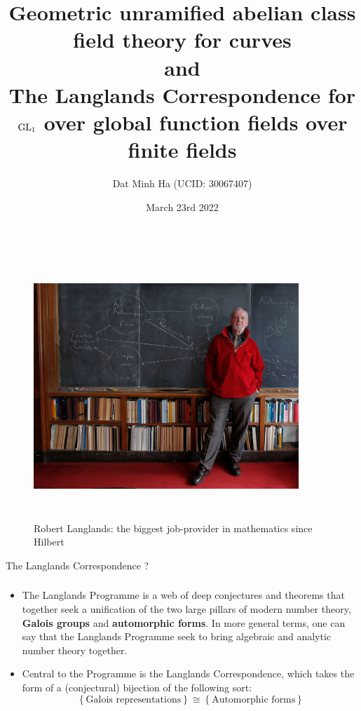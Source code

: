 \documentclass[professionalfonts]{beamer}
\title{Geometric unramified abelian class field theory for curves\\and\\The Langlands Correspondence for $\operatorname{GL}_1$ over global function fields over finite fields}
\author{Dat Minh Ha (UCID: 30067407)}
\institute{Department of Mathematics and Statistics\\University of Calgary}
\date{March 23rd 2022}
\begin{document}
    \frame{\titlepage}
    
    \begin{frame}
        \begin{figure}[H]
            \centering
            \includegraphics[width=10cm,height=10cm,keepaspectratio]{Proposal, timeline, and presentation/robert_langlands.jpg}
            \caption{Robert Langlands: the biggest job-provider in mathematics since Hilbert}
            \label{fig: robert_langlands}
        \end{figure}
    \end{frame}
    
    \begin{frame}{The Langlands Correspondence ?}
        \frametitle{}
        \begin{itemize}
            \item The Langlands Programme is a web of deep conjectures and theorems that together seek a unification of the two large pillars of modern number theory, \textbf{Galois groups} and \textbf{automorphic forms}. In more general terms, one can say that the Langlands Programme seek to bring algebraic and analytic number theory together.
            \item Central to the Programme is the Langlands Correspondence, which takes the form of a (conjectural) bijection of the following sort:    
                $$\left\{\text{Galois representations}\right\} \cong \left\{\text{Automorphic forms}\right\}$$
        \end{itemize}
    \end{frame}
    
\end{document}
